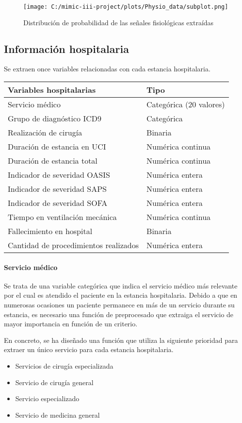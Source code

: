 \documentclass{report}
\begin{document}
\begin{figure}[H]
\texttt{[image: C:/mimic-iii-project/plots/Physio\_data/subplot.png]}
\caption{Distribución de probabilidad de las señales fisiológicas extraídas}
\end{figure}

\subsection{Información hospitalaria}

Se extraen once variables relacionadas con cada estancia hospitalaria.

\begin{longtable}[]{@{}ll@{}}
\toprule
Variables hospitalarias & Tipo\tabularnewline
\midrule
\endhead
Servicio médico & Categórica (20 valores)\tabularnewline
Grupo de diagnóstico ICD9 & Categórica\tabularnewline
Realización de cirugía & Binaria\tabularnewline
Duración de estancia en UCI & Numérica continua\tabularnewline
Duración de estancia total & Numérica continua\tabularnewline
Indicador de severidad OASIS & Numérica entera\tabularnewline
Indicador de severidad SAPS & Numérica entera\tabularnewline
Indicador de severidad SOFA & Numérica entera\tabularnewline
Tiempo en ventilación mecánica & Numérica continua\tabularnewline
Fallecimiento en hospital & Binaria\tabularnewline
Cantidad de procedimientos realizados & Numérica entera\tabularnewline
\bottomrule
\end{longtable}
\paragraph{Servicio médico}
Se trata de una variable categórica que indica el servicio médico más
relevante por el cual es atendido el paciente en la estancia
hospitalaria. Debido a que en numerosas ocasiones un paciente permanece
en más de un servicio durante su estancia, es necesario una función de
preprocesado que extraiga el servicio de mayor importancia en función de
un criterio.

En concreto, se ha diseñado una función que utiliza la siguiente
prioridad para extraer un único servicio para cada estancia
hospitalaria.

\begin{itemize}
\item
  Servicios de cirugía especializada 
\item
  Servicio de cirugía general
\item
  Servicio especializado
\item
  Servicio de medicina general
\end{itemize}
\end{document}
